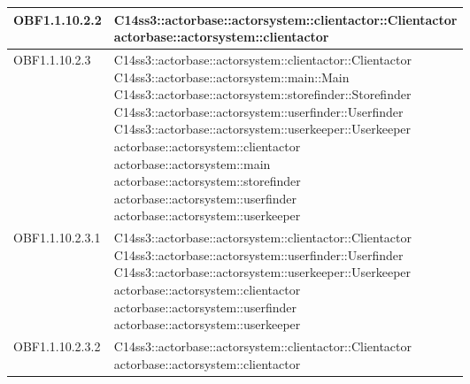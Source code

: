 \documentclass{scalatekids-article}
\begin{document}
\begin{longtable}[H]{|p{4.5cm}|p{13cm}|}
\hline
OBF1.1.10.2.2 & \multiLineCell[t]{C14ss3::actorbase::actorsystem::clientactor::Clientactor\\actorbase::actorsystem::clientactor\\}\\
\hline
OBF1.1.10.2.3 & \multiLineCell[t]{C14ss3::actorbase::actorsystem::clientactor::Clientactor\\C14ss3::actorbase::actorsystem::main::Main\\C14ss3::actorbase::actorsystem::storefinder::Storefinder\\C14ss3::actorbase::actorsystem::userfinder::Userfinder\\C14ss3::actorbase::actorsystem::userkeeper::Userkeeper\\actorbase::actorsystem::clientactor\\actorbase::actorsystem::main\\actorbase::actorsystem::storefinder\\actorbase::actorsystem::userfinder\\actorbase::actorsystem::userkeeper\\}\\
\hline
OBF1.1.10.2.3.1 & \multiLineCell[t]{C14ss3::actorbase::actorsystem::clientactor::Clientactor\\C14ss3::actorbase::actorsystem::userfinder::Userfinder\\C14ss3::actorbase::actorsystem::userkeeper::Userkeeper\\actorbase::actorsystem::clientactor\\actorbase::actorsystem::userfinder\\actorbase::actorsystem::userkeeper\\}\\
\hline
OBF1.1.10.2.3.2 & \multiLineCell[t]{C14ss3::actorbase::actorsystem::clientactor::Clientactor\\actorbase::actorsystem::clientactor\\}\\
\hline

\end{longtable}
\end{document}
